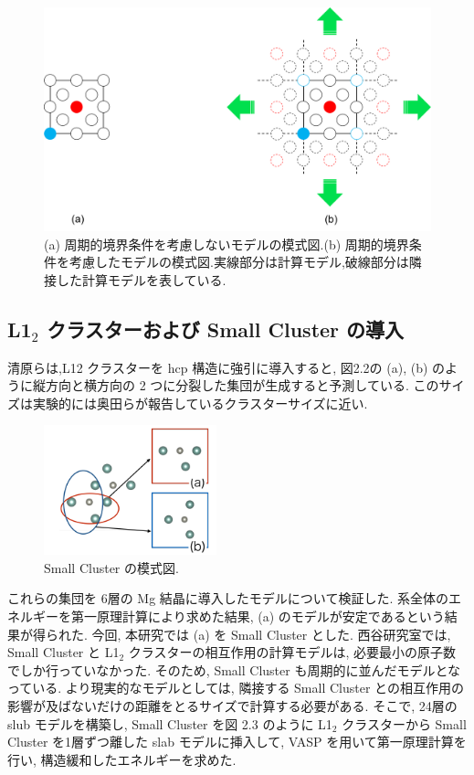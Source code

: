 \begin{figure}[htbp]
	\begin{center}
		\includegraphics[width=130mm]{../method/cnd.png}
		\caption{(a) 周期的境界条件を考慮しないモデルの模式図.(b) 周期的境界条件を考慮したモデルの模式図.実線部分は計算モデル,破線部分は隣接した計算モデルを表している.}
		\label{default}
	\end{center}
\end{figure}


\subsection{ L1$_2$ クラスターおよび Small Cluster の導入}
清原らは,L12 クラスターを hcp 構造に強引に導入すると, 図2.2の (a), (b) のように縦方向と横方向の 2 つに分裂した集団が生成すると予測している\cite{kiyohara}. このサイズは実験的には奥田らが報告しているクラスターサイズに近い\cite{okuda}. 

\begin{figure}[htbp]
	\begin{center}
		\includegraphics[width=50mm]{../method/MiniCluster.png}
		\caption{Small Cluster の模式図.}
		\label{default}
	\end{center}
\end{figure}

これらの集団を 6層の Mg 結晶に導入したモデルについて検証した. 系全体のエネルギーを第一原理計算により求めた結果, (a) のモデルが安定であるという結果が得られた. 今回, 本研究では (a) を Small Cluster とした. 西谷研究室では, Small Cluster と L1$_2$ クラスターの相互作用の計算モデルは, 必要最小の原子数でしか行っていなかった. そのため, Small Cluster も周期的に並んだモデルとなっている. より現実的なモデルとしては, 隣接する Small Cluster との相互作用の影響が及ばないだけの距離をとるサイズで計算する必要がある. そこで, 24層の slub モデルを構築し, Small Cluster を図 2.3 のように L1$_2$ クラスターから Small Cluster を1層ずつ離した slab モデルに挿入して, VASP を用いて第一原理計算を行い, 構造緩和したエネルギーを求めた.

